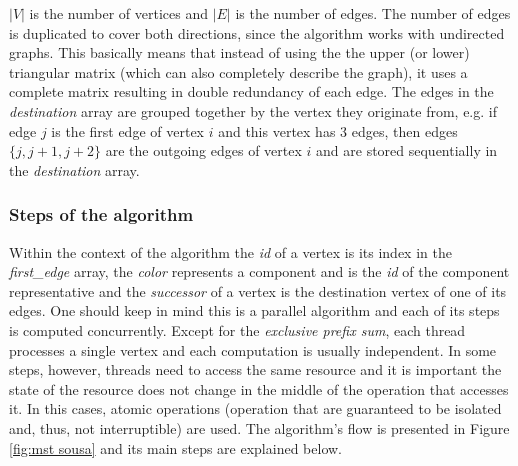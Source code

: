 $|V|$ is the number of vertices and $|E|$ is the number of edges.
The number of edges is duplicated to cover both directions, since the algorithm works with undirected graphs.
This basically means that instead of using the the upper (or lower) triangular matrix (which can also completely describe the graph), it uses a complete matrix resulting in double redundancy of each edge.
The edges in the \emph{destination} array are grouped together by the vertex they originate from, e.g. if edge $j$ is the first edge of vertex $i$ and this vertex has 3 edges, then edges $\{j,j+1,j+2\}$ are the outgoing edges of vertex $i$ and are stored sequentially in the \emph{destination} array.

\subsubsection{Steps of the algorithm}

Within the context of the algorithm the \emph{id} of a vertex is its index in the \emph{first\_edge} array, the \emph{color} represents a component and is the \emph{id} of the component representative and the \emph{successor} of a vertex is the destination vertex of one of its edges.
One should keep in mind this is a parallel algorithm and each of its steps is computed concurrently.
Except for the \emph{exclusive prefix sum}, each thread processes a single vertex and each computation is usually independent.
In some steps, however, threads need to access the same resource and it is important the state of the resource does not change in the middle of the operation that accesses it.
In this cases, atomic operations (operation that are guaranteed to be isolated and, thus, not interruptible) are used.
The algorithm's flow is presented in Figure \ref{fig:mst sousa} and its main steps are explained below.

